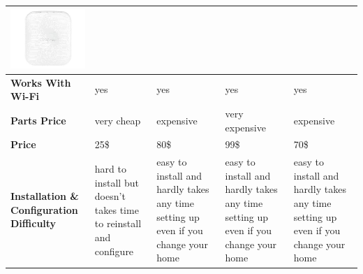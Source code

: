 \documentclass[a4paper, 12pt, oneside]{book}
\newcommand\boldcolor[1]{\textcolor{bold}{\textbf{#1}}}
\begin{document}
\begin{table}[H]
\begin{center}
\begin{tabularx}{\linewidth}{|m{4cm}*4{|X}|}
						\includegraphics[width=\linewidth]{img/samsung_hw.png}
					 \\\hline
					\boldcolor{Works With Wi-Fi} & yes & yes & yes & yes  \\\hline


					
					\boldcolor{Parts Price} & very cheap & expensive & very expensive & expensive  \\\hline
					\boldcolor{Price} & 25\$ & 80\$ & 99\$ & 70\$ \\\hline
					
					\boldcolor{Installation \& Configuration Difficulty} & hard to install but doesn't takes time to reinstall and configure& easy to install and hardly takes any time setting up even if you change your home  & easy to install and hardly takes any time setting up even if you change your home  & easy to install and hardly takes any time setting up even if you change your home
					\\\hline
				\end{tabularx}
			\end{center}
		\end{table}
		\newpage	
\end{document}
